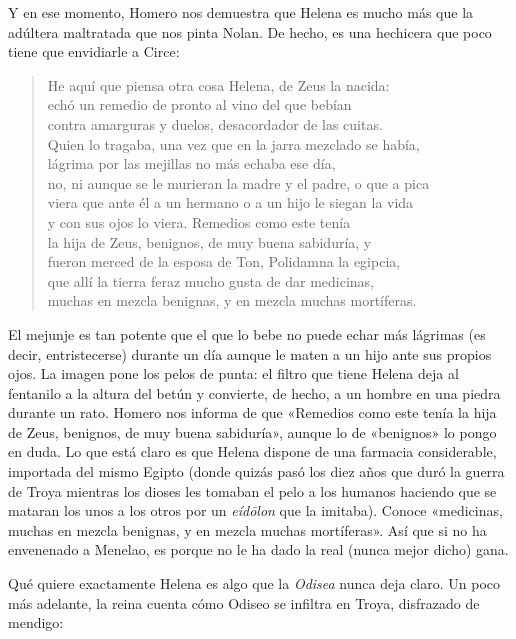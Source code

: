 \documentclass[11pt,a4paper]{article}
\begin{document}
Y en ese momento, Homero nos demuestra que Helena es mucho más que la adúltera maltratada que nos pinta Nolan. De hecho, es una hechicera que poco tiene que envidiarle a Circe:


\begin{verse}
He aquí que piensa otra cosa Helena, de Zeus la nacida:\\
echó un remedio de pronto al vino del que bebían\\
contra amarguras y duelos, desacordador de las cuitas.\\
Quien lo tragaba, una vez que en la jarra mezclado se había,\\
lágrima por las mejillas no más echaba ese día,\\
no, ni aunque se le murieran la madre y el padre, o que a pica\\
viera que ante él a un hermano o a un hijo le siegan la vida\\
y con sus ojos lo viera. Remedios como este tenía\\
la hija de Zeus, benignos, de muy buena sabiduría, y\\
fueron merced de la esposa de Ton, Polidamna la egipcia,\\
que allí la tierra feraz mucho gusta de dar medicinas,\\
muchas en mezcla benignas, y en mezcla muchas mortíferas.
\end{verse}

El mejunje es tan potente que el que lo bebe no puede echar más lágrimas (es decir, entristecerse) durante un día aunque le maten a un hijo ante sus propios ojos. La imagen pone los pelos de punta: el filtro que tiene Helena deja al fentanilo a la altura del betún y convierte, de hecho, a un hombre en una piedra durante un rato. Homero nos informa de que «Remedios como este tenía la hija de Zeus, benignos, de muy buena sabiduría», aunque lo de «benignos» lo pongo en duda. Lo que está claro es que Helena dispone de una farmacia considerable, importada del mismo Egipto (donde quizás pasó los diez años que duró la guerra de Troya mientras los dioses les tomaban el pelo a los humanos haciendo que se mataran los unos a los otros por un \emph{eídōlon} que la imitaba). Conoce «medicinas, muchas en mezcla benignas, y en mezcla muchas mortíferas». Así que si no ha envenenado a Menelao, es porque no le ha dado la real (nunca mejor dicho) gana.

Qué quiere exactamente Helena es algo que la \emph{Odisea} nunca deja claro. Un poco más adelante, la reina cuenta cómo Odiseo se infiltra en Troya, disfrazado de mendigo:
\end{document}
